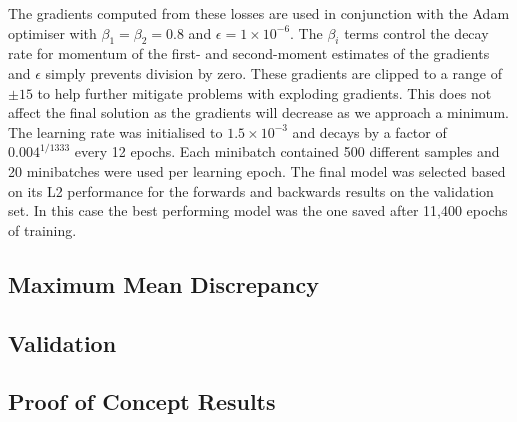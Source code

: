 The gradients computed from these losses are used in conjunction with the Adam optimiser \citep{2014Kingma} with $\beta_1=\beta_2=0.8$ and $\epsilon=1\times10^{-6}$.
The $\beta_i$ terms control the decay rate for momentum of the first- and second-moment estimates of the gradients and $\epsilon$ simply prevents division by zero.
These gradients are clipped to a range of $\pm15$ to help further mitigate problems with exploding gradients.
This does not affect the final solution as the gradients will decrease as we approach a minimum.
The learning rate was initialised to $1.5\times10^{-3}$ and decays by a factor of $0.004^{1/1333}$ every 12 epochs.
Each minibatch contained 500 different samples and 20 minibatches were used per learning epoch.
The final model was selected based on its L2 performance for the forwards and backwards results on the validation set.
In this case the best performing model was the one saved after 11,400 epochs of training.



\subsection{Maximum Mean Discrepancy}\label{Sec:Mmd}

\subsection{Validation}

\subsection{Proof of Concept Results}